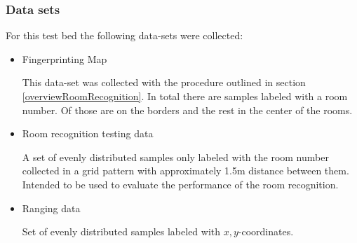 \subsubsection{Data sets}
For this test bed the following data-sets were collected:
\begin{itemize}
\item Fingerprinting Map

This data-set was collected with the procedure outlined in section \ref{overviewRoomRecognition}. In total there are  samples labeled with a room number. Of those  are on the borders and the rest in the center of the rooms. 
\item Room recognition testing data

A set of evenly distributed samples only labeled with the room number collected in a grid pattern with approximately 1.5m distance between them. Intended to be used to evaluate the performance of the room recognition.

\item Ranging data

Set of  evenly distributed samples labeled with \(x,y\)-coordinates. 
\end{itemize}








